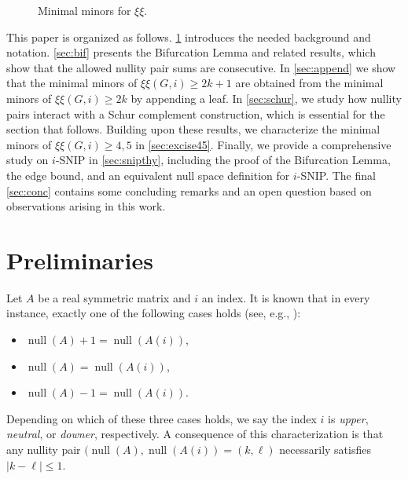 \documentclass{article}
\theoremstyle{definition}
\newcommand{\nul}{\operatorname{null}}
\newcommand{\excise}{\xi\xi}
\begin{document}
\begin{figure}[t]
\caption{Minimal minors for $\excise$.}
\label{fig:minminor}
\end{figure}

This paper is organized as follows. \cref{ssec:prelim} introduces the needed background and notation. \cref{sec:bif} presents the Bifurcation Lemma and related results, which show that the allowed nullity pair sums are consecutive. In \cref{sec:append} we show that the minimal minors of $\excise(G, i) \geq 2k + 1$ are obtained from the minimal minors of $\excise(G, i) \geq 2k$ by appending a leaf. In \cref{sec:schur}, we study how nullity pairs interact with a Schur complement construction, which is essential for the section that follows.  Building upon these results, we characterize the minimal minors of $\excise(G, i) \geq 4,5$ in \cref{sec:excise45}. Finally, we provide a comprehensive study on $i$-SNIP in \cref{sec:snipthy}, including the proof of the Bifurcation Lemma, the edge bound, and an equivalent null space definition for $i$-SNIP.
The final \cref{sec:conc} contains some concluding remarks and an open question based on observations arising in this work.

\section{Preliminaries}
\label{ssec:prelim}
Let $A$ be a real symmetric matrix and $i$ an index.  It is known that in every instance, exactly one of the following cases holds (see, e.g., \cite[Remark~2.1]{SNIP}):
\begin{itemize}
\item $\nul(A) + 1 = \nul(A(i))$, 
\item $\nul(A) = \nul(A(i))$,
\item $\nul(A) - 1 = \nul(A(i))$.
\end{itemize}
Depending on which of these three cases holds, we say the index $i$ is \emph{upper}, \emph{neutral}, or \emph{downer}, respectively.
A consequence of this characterization is that any nullity pair $(\nul(A),\nul(A(i)) = (k,\ell)$ necessarily satisfies $|k - \ell| \leq 1$.  
\end{document}
